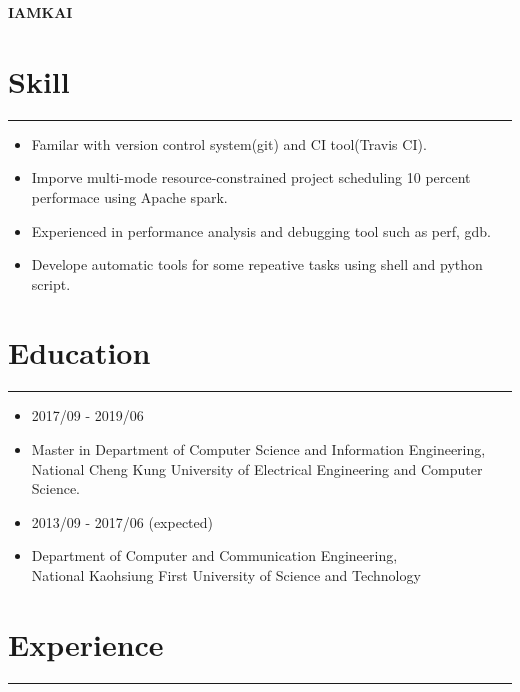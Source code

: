 \documentclass[12pt]{article}
\begin{document}
\begin{center}

\noindent  \LARGE{\textbf{IAMKAI}}  
\normalsize
\end{center}

	\section*{Skill}
	\nointerlineskip
	\noindent\rule{450pt}{0.4pt}
	
	\begin{itemize}
	\item Familar with version control system(git) and CI tool(Travis CI).
  	\item Imporve multi-mode resource-constrained project scheduling 10 percent performace using Apache spark.
  	\item Experienced in performance analysis and debugging tool such as perf, gdb.
  	\item Develope automatic tools for some repeative tasks using shell and python script.
	\end{itemize}


	
	\section*{Education}
	\nointerlineskip
	\noindent\rule{450pt}{0.4pt}
	  \begin{itemize}
	  \item 2017/09 - 2019/06
	  \vspace{-5pt}
	  \item[] Master in Department of Computer Science and Information Engineering,
      \\ National Cheng Kung University of Electrical Engineering and Computer Science.
	  \end{itemize}
	  
	  
	  \begin{itemize}
	  	\item 2013/09 - 2017/06 (expected)
	  	\vspace{-5pt}
	  	\item[]       Department of Computer and Communication Engineering, 
      \\National Kaohsiung First University of Science and Technology
	  \end{itemize}


	\section*{Experience}
	\nointerlineskip
	\noindent\rule{450pt}{0.4pt}
	
\end{document}
